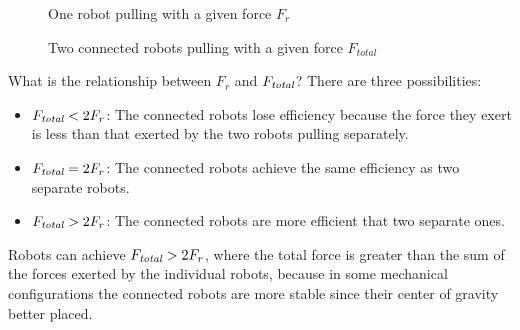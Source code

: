 \begin{figure}
\begin{center}
\caption{One robot pulling with a given force $F_r$}\label{fig.pulling1}
\end{center}
\end{figure}

\begin{figure}
\begin{center}
\caption{Two connected robots pulling with a given force $F_{total}$}\label{fig.pulling2}
\end{center}
\end{figure}

What is the relationship between $F_r$ and $F_{\textit{\scriptsize total}}$? There are three possibilities:
\begin{itemize}
\item $F_{\textit{\scriptsize total}} < 2 F_r$: The connected robots lose efficiency because the force they exert is less than that exerted by the two robots pulling separately.
\item $F_{\textit{\scriptsize total}} = 2 F_r$: The connected robots achieve the same efficiency as two separate robots.
\item $F_{\textit{\scriptsize total}} > 2 F_r$: The connected robots are more efficient that two separate ones.
\end{itemize}
Robots can achieve $F_{\textit{\scriptsize total}} > 2 F_r$, where the total force is greater than the sum of the forces exerted by the individual robots, because in some mechanical configurations the connected robots are more stable since their center of gravity better placed. 

